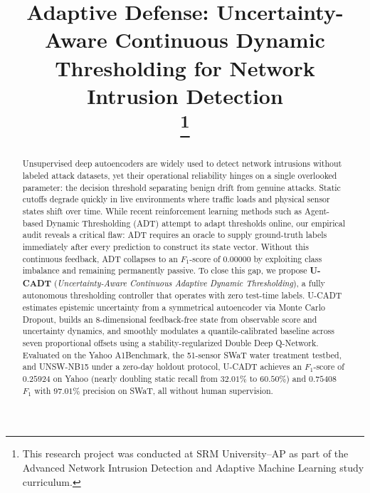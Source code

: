 \documentclass[conference]{IEEEtran}
\begin{document}
\title{Adaptive Defense: Uncertainty-Aware Continuous Dynamic Thresholding for Network Intrusion Detection\\
\thanks{This research project was conducted at SRM University--AP as part of the Advanced Network Intrusion Detection and Adaptive Machine Learning study curriculum.}
}

\author{
\and
{}
}

\maketitle

\begin{abstract}
Unsupervised deep autoencoders are widely used to detect network intrusions without labeled attack datasets, yet their operational reliability hinges on a single overlooked parameter: the decision threshold separating benign drift from genuine attacks. Static cutoffs degrade quickly in live environments where traffic loads and physical sensor states shift over time. While recent reinforcement learning methods such as Agent-based Dynamic Thresholding (ADT) attempt to adapt thresholds online, our empirical audit reveals a critical flaw: ADT requires an oracle to supply ground-truth labels immediately after every prediction to construct its state vector. Without this continuous feedback, ADT collapses to an $F_1$-score of $0.00000$ by exploiting class imbalance and remaining permanently passive. To close this gap, we propose \textbf{U-CADT} (\textit{Uncertainty-Aware Continuous Adaptive Dynamic Thresholding}), a fully autonomous thresholding controller that operates with zero test-time labels. U-CADT estimates epistemic uncertainty from a symmetrical autoencoder via Monte Carlo Dropout, builds an 8-dimensional feedback-free state from observable score and uncertainty dynamics, and smoothly modulates a quantile-calibrated baseline across seven proportional offsets using a stability-regularized Double Deep Q-Network. Evaluated on the Yahoo A1Benchmark, the 51-sensor SWaT water treatment testbed, and UNSW-NB15 under a zero-day holdout protocol, U-CADT achieves an $F_1$-score of $0.25924$ on Yahoo (nearly doubling static recall from $32.01\%$ to $60.50\%$) and $0.75408$ $F_1$ with $97.01\%$ precision on SWaT, all without human supervision.
\end{abstract}
\end{document}
